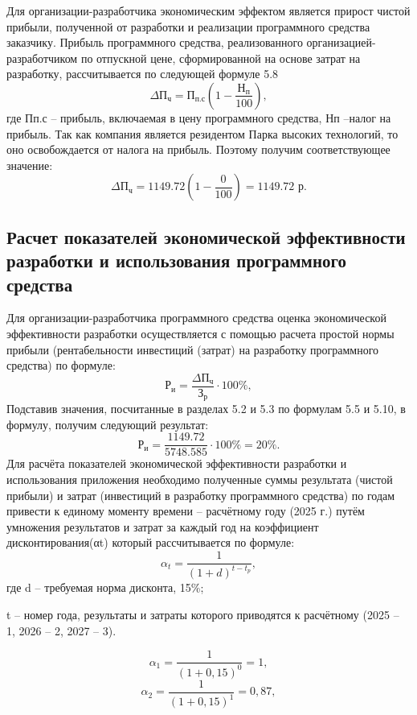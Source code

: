 Для организации-разработчика экономическим эффектом является прирост чистой прибыли, полученной от разработки и реализации программного средства заказчику.
Прибыль программного средства, реализованного организацией-разработчиком по отпускной цене, сформированной на основе затрат на разработку, рассчитывается по следующей формуле 5.8
\begin{equation}
	\Delta 	\mathrm{П_{ч}} = \mathrm{П_{п.с}} \left( 1 - \frac{	\mathrm{Н_{п}}}{100} \right),
\end{equation}
где Пп.с – прибыль, включаемая в цену программного средства, Нп –налог на прибыль. Так как компания является резидентом Парка высоких технологий, то оно освобождается от налога на прибыль. Поэтому получим соответствующее значение:
\[
\Delta \mathrm{П_{ч}} = 1149.72 \left(1 - \frac{0}{100}\right) = 1149.72 \text{ р}.
\]

\subsection{Расчет показателей экономической эффективности разработки и использования программного средства} 

Для организации-разработчика программного средства оценка экономической эффективности разработки осуществляется с помощью расчета простой нормы прибыли (рентабельности инвестиций (затрат) на разработку программного средства) по формуле:
\begin{equation}
	\mathrm{Р_{и}} = \frac{\Delta 	\mathrm{П_{ч}}}{\mathrm{З_{р}}} \cdot 100\%,
\end{equation}
Подставив значения, посчитанные в разделах 5.2 и 5.3 по формулам 5.5 и 5.10, в формулу, получим следующий результат:
\[
\mathrm{Р_{и}} = \frac{1149.72}{5748.585} \cdot 100\% = 20\%.
\]
Для расчёта показателей экономической эффективности разработки и использования приложения необходимо полученные суммы результата (чистой прибыли) и затрат (инвестиций в разработку программного средства) по годам привести к единому моменту времени – расчётному году (2025 г.) путём умножения результатов и затрат за каждый год на коэффициент дисконтирования(αt) который рассчитывается по формуле:
\begin{equation}
	\alpha_t = \frac{1}{(1 + d)^{t - t_p}},
\end{equation}
где d – требуемая норма дисконта, 15\%;

t – номер года, результаты и затраты которого приводятся к расчётному (2025 – 1, 2026 – 2, 2027 – 3).

\[
\alpha_1 = \frac{1}{(1+0{,}15)^0} = 1,
\]
\[
\alpha_2 = \frac{1}{(1+0{,}15)^1} = 0{,}87,
\]

